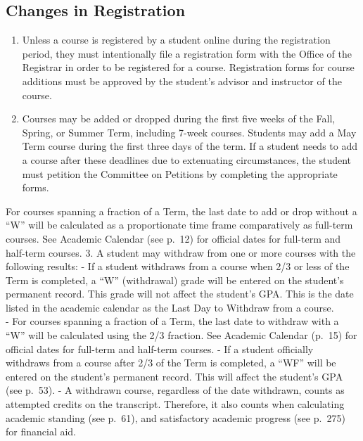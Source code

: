 \documentclass[
  letterpaper,
]{scrbook}
\providecommand{\tightlist}{%
  \setlength{\itemsep}{0pt}\setlength{\parskip}{0pt}}
\begin{document}
\subsection{Changes in Registration}\label{changes-in-registration}

\begin{enumerate}
\def\labelenumi{\arabic{enumi}.}
\tightlist
\item
  Unless a course is registered by a student online during the
  registration period, they must intentionally file a registration form
  with the Office of the Registrar in order to be registered for a
  course. Registration forms for course additions must be approved by
  the student's advisor and instructor of the course.
\item
  Courses may be added or dropped during the first five weeks of the
  Fall, Spring, or Summer Term, including 7-week courses. Students may
  add a May Term course during the first three days of the term. If a
  student needs to add a course after these deadlines due to extenuating
  circumstances, the student must petition the Committee on Petitions by
  completing the appropriate forms.
\end{enumerate}

For courses spanning a fraction of a Term, the last date to add or drop
without a ``W'' will be calculated as a proportionate time frame
comparatively as full-term courses. See Academic Calendar (see p.~12)
for official dates for full-term and half-term courses. 3. A student may
withdraw from one or more courses with the following results: - If a
student withdraws from a course when 2/3 or less of the Term is
completed, a ``W'' (withdrawal) grade will be entered on the student's
permanent record. This grade will not affect the student's GPA. This is
the date listed in the academic calendar as the Last Day to Withdraw
from a course.\\
- For courses spanning a fraction of a Term, the last date to withdraw
with a ``W'' will be calculated using the 2/3 fraction. See Academic
Calendar (p.~15) for official dates for full-term and half-term courses.
- If a student officially withdraws from a course after 2/3 of the Term
is completed, a ``WF'' will be entered on the student's permanent
record. This will affect the student's GPA (see p.~53). - A withdrawn
course, regardless of the date withdrawn, counts as attempted credits on
the transcript. Therefore, it also counts when calculating academic
standing (see p.~61), and satisfactory academic progress (see p.~275)
for financial aid.
\end{document}
